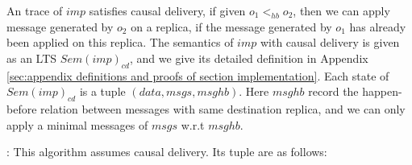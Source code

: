 An trace of $\mathit{imp}$ satisfies causal delivery, if given $o_1 <_{\mathit{hb}} o_2$, then we can apply message generated by $o_2$ on a replica, if the message generated by $o_1$ has already been applied on this replica. The semantics of $\mathit{imp}$ with causal delivery is given as an LTS $\mathit{Sem}(\mathit{imp})_{\mathit{cd}}$, and we give its detailed definition in Appendix \ref{sec:appendix definitions and proofs of section implementation}. Each state of $\mathit{Sem}(\mathit{imp})_{\mathit{cd}}$ is a tuple $(\mathit{data},\mathit{msgs},\mathit{msghb})$. {\color {red}Here $\mathit{msghb}$ record the happen-before relation between messages with same destination replica, and we can only apply a minimal messages of $\mathit{msgs}$ w.r.t $\mathit{msghb}$.}




: This algorithm assumes causal delivery. Its tuple are as follows:

